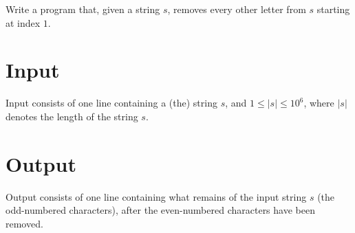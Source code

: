 
Write a program that, given a string $s$, removes every other letter from $s$ starting at index $1$.

\section*{Input}
Input consists of one line containing a (the) string $s$, and $1 \leq |s| \leq 10^6$, where $|s|$ denotes the length of the string $s$.

\section*{Output}
Output consists of one line containing what remains of the input string $s$ (the odd-numbered characters), after the even-numbered characters have been removed.
